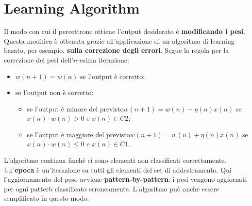 \section{Learning Algorithm}
Il modo con cui il percettrone ottiene l'output desiderato è \textbf{modificando i pesi}. Questa modifica è ottenuta grazie all'applicazione di un algoritmo di learning basato, per esempio, \textbf{sulla correzione degli errori}. Segue la regola per la correzione dei pesi dell'$n$-esima iterazione:
\begin{itemize}
    \item $w(n+1) = w(n)$ se l'output è corretto;
    \item se l'output non è corretto:
    \begin{itemize}
        \item se l'output è minore del previsto\newline $w(n+1) = w(n) - \eta(n)x(n)$ se $x(n) \cdot w(n) > 0$ e $x(n) \in C2$;
        \item se l'output è maggiore del previsto\newline $w(n+1) = w(n) +\eta(n)x(n)$ se $x(n) \cdot w(n) \leq 0$ e $x(n) \in C1$.
    \end{itemize}
\end{itemize}
L'algoritmo continua finché ci sono elementi non classificati correttamente.\newline
Un'\textbf{epoca} è un'iterazione su tutti gli elementi del set di addestramento. Qui l'aggiornamento del peso avviene \textbf{pattern-by-pattern}: i pesi vengono aggiornati per ogni patterb classificato erroneamente.
\newline
L'algoritmo può anche essere semplificato in questo modo:
\newpage
